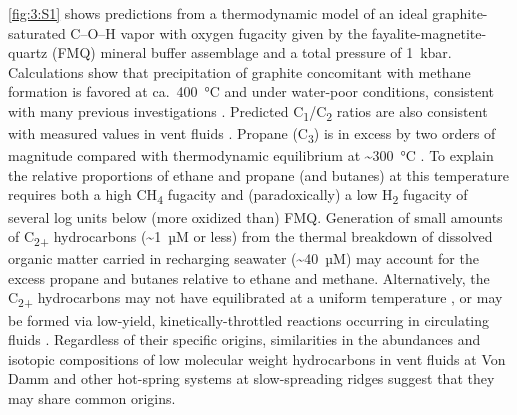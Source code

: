 \autoref{fig:3:S1} shows predictions from a thermodynamic model of an
ideal graphite-saturated C--O--H vapor with oxygen fugacity given by the
fayalite-magnetite-quartz (FMQ) mineral buffer assemblage and a total
pressure of 1~kbar. Calculations show that precipitation of graphite
concomitant with methane formation is favored at ca.\ 400~°C and under
water-poor conditions, consistent with many previous investigations \parencite{French_1966_RG,Eugster+Skippen_1967,Ohmoto+Kerrick_1977_AJS,Holloway_1984_G,FruhGreen++_2004}. Predicted
C\textsubscript{1}/C\textsubscript{2} ratios are also consistent with
measured values in vent fluids \parencite[][and \autoref{fig:3:S1}]{McDermott_2015_thesis}.
Propane (C\textsubscript{3}) is in excess by two orders of magnitude
compared with thermodynamic equilibrium at \textasciitilde{}300~°C
\parencite[][and \autoref{fig:3:S1}]{McDermott_2015_thesis}. To explain the relative
proportions of ethane and propane (and butanes) at this temperature
requires both a high CH\textsubscript{4} fugacity and (paradoxically) a
low H\textsubscript{2} fugacity of several log units below (more
oxidized than) FMQ. Generation of small amounts of C\textsubscript{2+}
hydrocarbons (\textasciitilde{}1~µM or less) from the thermal breakdown
of dissolved organic matter carried in recharging seawater
(\textasciitilde{}40~µM) may account for the excess propane and butanes
relative to ethane and methane. Alternatively, the C\textsubscript{2+}
hydrocarbons may not have equilibrated at a uniform temperature
\parencite{McDermott_2015_thesis}, or may be formed via low-yield, kinetically-throttled
reactions occurring in circulating fluids \parencite{Foustoukos+Seyfried_2004_S}. Regardless of their specific origins, similarities in the
abundances and isotopic compositions of low molecular weight
hydrocarbons in vent fluids at Von Damm and other hot-spring systems at
slow-spreading ridges suggest that they may share common origins.

